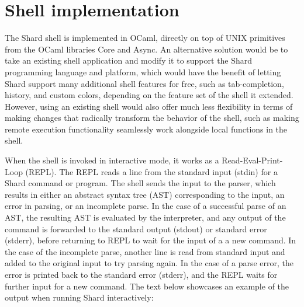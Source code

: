 \documentclass[twoside]{report}
\begin{document}
\section{Shell implementation}


The Shard shell is implemented in OCaml, directly on top of UNIX primitives from the OCaml libraries Core and Async.
An alternative solution would be to take an existing shell application and modify it to support the Shard programming language and platform, which would have the benefit of letting Shard support many additional shell features for free, such as tab-completion, history, and custom colors, depending on the feature set of the shell it extended.
However, using an existing shell would also offer much less flexibility in terms of making changes that radically transform the behavior of the shell, such as making remote execution functionality seamlessly work alongside local functions in the shell.

When the shell is invoked in interactive mode, it works as a Read-Eval-Print-Loop (REPL). The REPL reads a line from the standard input (stdin) for a Shard command or program. The shell sends the input to the parser, which results in either an abstract syntax tree (AST) corresponding to the input, an error in parsing, or an incomplete parse.
In the case of a successful parse of an AST, the resulting AST is evaluated by the interpreter, and any output of the command is forwarded to the standard output (stdout) or standard error (stderr), before returning to REPL to wait for the input of a a new command.
In the case of the incomplete parse, another line is read from standard input and added to the original input to try parsing again.
In the case of a parse error, the error is printed back to the standard error (stderr), and the REPL waits for further input for a new command.
The text below showcases an example of the output when running Shard interactively:
\end{document}
